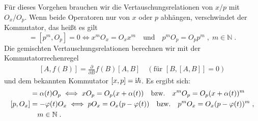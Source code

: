   Für dieses Vorgehen brauchen wir die Vertauschungsrelationen von $x/p$ mit $O_x/O_p$.
  Wenn beide Operatoren nur von $x$ oder $p$ abhängen, verschwindet der Kommutator, das heißt es gilt
  \begin{equation}
    [x^m,O_x]=[p^m,O_p]=0\iff x^mO_x=O_xx^m\quad\text{und}\quad p^mO_p=O_pp^m\;,\; m \in \mathbb{N} \; .
  \end{equation}
  Die gemischten Vertauschungsrelationen berechnen wir mit der Kommutatorrechenregel
  \begin{align}
    [A,f(B)]=\frac{\partial}{\partial B}f(B)[A,B]\quad (\text{für $[B,[A,B]]=0$})
  \end{align}
  und dem bekannten Kommutator $[x,p]=\text i \hbar$.
  Es ergibt sich:
  \begin{align}
    [x,O_p]&=\alpha(t)O_p\iff xO_p=O_p(x+\alpha(t))\quad\text{bzw.}\quad
    x^mO_p=O_p(x+\alpha(t))^m \label{kommutator_1}\\
    [p,O_x]&=-\varphi(t)O_x\iff pO_x=O_x(p-\varphi(t))\quad\text{bzw.}\quad
    p^mO_x=O_x(p-\varphi(t))^m \;, \label{kommutator_2} \\
    &\quad m \in \mathbb{N} \;. \notag
  \end{align}

